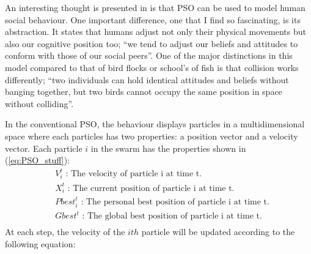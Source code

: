   An interesting thought is presented in \cite{pso} is that PSO can be used to model human social behaviour. One important difference, one that I find so fascinating, is its abstraction. It states that humans adjust not only their physical movements but also our cognitive position too; ``we tend to adjust our beliefs and attitudes to conform with those of our social peers''\cite{pso}. One of the major distinctions in this model compared to that of bird flocks or school's of fish is that collision works differently; ``two individuals can hold identical attitudes and beliefs without banging together, but two birds cannot occupy the same position in space without colliding''.

  In the conventional PSO, the behaviour displays particles in a multidimensional space where each particles has two properties: a position vector and a velocity vector. Each particle $i$ in the swarm has the properties shown in (\ref{eq:PSO_stuff}):
    \begin{equation} \label{eq:PSO_stuff}
      \begin{split}
        & V_i^t \text{ : The velocity of particle i at time t.} \\
        & X_i^t \text{ : The current position of particle i at time t.} \\
        & Pbest_i^t \text{ : The personal best position of particle i at time t.} \\
        & Gbest^t \text{ : The global best position of particle i at time t.} \\
      \end{split}
    \end{equation}
    At each step, the velocity of the $ith$ particle will be updated according to the following equation:
